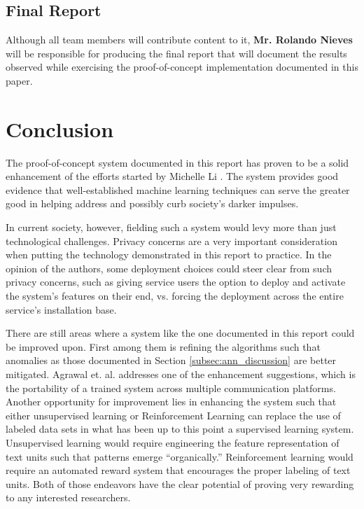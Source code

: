 \documentclass[conference]{sig-alternate-05-2015}
\begin{document}
\subsection{Final Report}\label{sec:report_task}
Although all team members will contribute content to it,
\textbf{Mr. Rolando Nieves} will be responsible for producing the final report
that will document the results observed while exercising the proof-of-concept
implementation documented in this paper.

\section{Conclusion}\label{sec:conclusion}

The proof-of-concept system documented in this report has proven to be a solid
enhancement of the efforts started by Michelle Li \cite{Li2016}. The system
provides good evidence that well-established machine learning techniques can
serve the greater good in helping address and possibly curb society's darker
impulses.

In current society, however, fielding such a system would levy more than just
technological challenges. Privacy concerns are a very important consideration
when putting the technology demonstrated in this report to practice. In the
opinion of the authors, some deployment choices could steer clear from such
privacy concerns, such as giving service users the option to deploy and activate
the system's features on their end, vs. forcing the deployment across the
entire service's installation base.

There are still areas where a system like the one documented in this report
could be improved upon. First among them is refining the algorithms such that
anomalies as those documented in Section \ref{subsec:ann_discussion} are better
mitigated. Agrawal et. al. \cite{agrawal2018deep} addresses one of the
enhancement suggestions, which is the portability of a trained system across
multiple communication platforms. Another opportunity for improvement lies in
enhancing the system such that either unsupervised learning or Reinforcement
Learning can replace the use of labeled data sets in what has been up to this
point a supervised learning system. Unsupervised learning would require
engineering the feature representation of text units such that patterns emerge
``organically.'' Reinforcement learning would require an automated reward system
that encourages the proper labeling of text units. Both of those endeavors have
the clear potential of proving very rewarding to any interested researchers.
\end{document}
